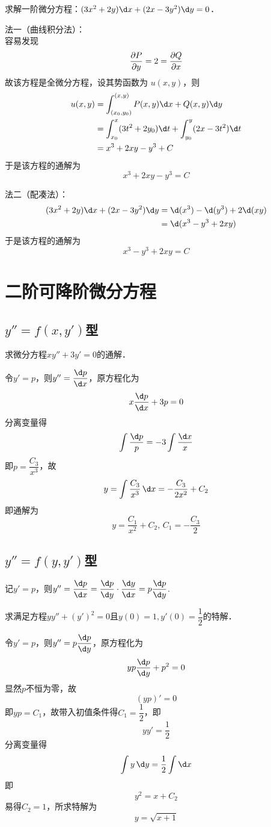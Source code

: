 \documentclass[12pt, a4paper, oneside, UTF8]{ctexbook}
\begin{document}
\begin{example}
    求解一阶微分方程：$(3x^2+2y)\d x + (2x-3y^2)\d y = 0$．
\end{example}
\begin{solution}
    法一（曲线积分法）：\\
    容易发现
    \[ \pdv{P}{y} = 2 = \pdv{Q}{x} \]
    故该方程是全微分方程，设其势函数为 $u(x,y)$，则
    \begin{align*}
        u(x,y) &= \int_{(x_0,y_0)}^{(x,y)} P(x,y)\d x + Q(x,y)\d y \\
        &= \int_{x_0}^x (3t^2+2y_0)\d t + \int_{y_0}^y (2x-3t^2)\d t \\
        &= x^3 + 2xy - y^3 + C
    \end{align*}
    于是该方程的通解为
    \[ \boxed{x^3 + 2xy - y^3 = C} \]

    法二（配凑法）：\\
    \begin{align*}
        (3x^2+2y)\d x + (2x-3y^2)\d y &=
        \d(x^3) - \d(y^3) + 2\d(xy)  \\
        &= \d(x^3 - y^3 + 2xy)
    \end{align*}
    于是该方程的通解为
    \[ \boxed{x^3 - y^3 + 2xy = C} \]
\end{solution}

\section{二阶可降阶微分方程}
\subsection{$y''=f(x,y')$型}
\begin{example}
    求微分方程$xy''+3y'=0$的通解．
\end{example}
\begin{solution}
    令$y'=p$，则$y''=\dfrac{\d p}{\d x}$，原方程化为
    \[x\dfrac{\d p}{\d x}+3p=0\]
    分离变量得
    \[\int \dfrac{\d p}{p}=-3\int \dfrac{\d x}{x}\]
    即$p=\dfrac{C_3}{x^3}$，故
    \[y=\int \dfrac{C_3}{x^3}\,\d x=-\dfrac{C_3}{2x^2}+C_2\]
    即通解为
    \[\boxed{y=\dfrac{C_1}{x^2}+C_2},\,C_1 = -\dfrac{C_3}{2}\]
\end{solution}
\subsection{$y''=f(y,y')$型}
记$y' = p$，则$y'' = \dfrac{\d p}{\d x} = \dfrac{\d p}{\d y} \cdot \dfrac{\d y}{\d x} = p \dfrac{\d p}{\d y}$.
\begin{example}
    求满足方程$y y''+(y')^2=0$且$y(0)=1,y'(0)=\dfrac{1}{2}$的特解．
\end{example}
\begin{solution}
    令$y'=p$，则$y''=p\dfrac{\d p}{\d y}$，原方程化为
    \[y p \dfrac{\d p}{\d y} + p^2=0\]
    显然$p$不恒为零，故
    \[(yp)'=0\]
    即$yp=C_1$，故带入初值条件得$C_1=\dfrac{1}{2}$，即
    \[y y'=\dfrac{1}{2}\]
    分离变量得
    \[\int y\,\d y=\dfrac{1}{2}\int \d x\]
    即
    \[y^2=x+C_2\]
    易得$C_2=1$，所求特解为
    \[\boxed{y=\sqrt{x+1}}\]
\end{solution}
\end{document}
